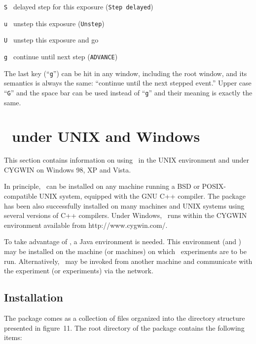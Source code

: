 \noindent
{\tt S~} delayed step for this exposure ({\tt Step~delayed})

\noindent
{\tt u~} unstep this exposure ({\tt Unstep})

\noindent
{\tt U~} unstep this exposure and go

\noindent
{\tt g~} continue until next step ({\tt ADVANCE})

\medskip

The last key (``{\tt g}'') can be hit in any window, including the root window,
and its semantics is always the same: ``continue until the next stepped
event.''
Upper case ``{\tt G}'' and the space bar can be used instead of ``{\tt g}''
and their meaning is exactly the same.

\section{\smurph\ under UNIX and Windows}
\label{rm_un}

This section contains information on using \smurph\ in the UNIX
environment and under CYGWIN on Windows 98, XP and Vista.

In principle, \smurph\ can be installed on any machine running
a BSD or POSIX-compatible UNIX system, equipped with the GNU C++ compiler.
The package has been also successfully installed on many machines
and UNIX systems using several versions of C++ compilers.
Under Windows, \smurph\ runs within the CYGWIN environment available
from {http://www.cygwin.com/}.

To take advantage of \dsd, a Java environment is needed.
This environment (and \dsd) may
be installed on the machine (or machines) on which
\smurph\ experiments are to be run.
Alternatively, \dsd\ may be invoked from another machine and communicate
with the experiment (or experiments) via the network.


\subsection{Installation}
\label{rm_un_in}

The package comes as a collection of files organized into the directory
structure presented in
figure~11.
The root directory of the package contains the following items:

